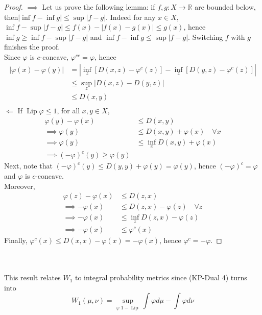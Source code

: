 \documentclass{article}
\theoremstyle{definition}
\theoremstyle{remark}
\DeclareMathOperator{\lip}{Lip}
\begin{document}
\begin{proof}
$\implies$ Let us prove the following lemma: if $f,g:X \to \mathbb R$ are bounded below, then\newline $|\inf f -\inf g|\leq \sup |f-g|$. Indeed for any $x\in X$, $\inf f - \sup |f-g| \leq f(x) - |f(x)-g(x)|\leq g(x)$, hence $\inf g \geq \inf f - \sup |f-g|$ and $\inf f - \inf g \leq \sup|f-g|$. Switching $f$ with $g$ finishes the proof.\\
Since $\varphi$ is $c$-concave, $\varphi^{cc}=\varphi$, hence $$\begin{aligned}|\varphi(x)-\varphi(y)| &= |\inf_z [D(x,z)-\varphi^{c}(z)]-\inf_z [D(y,z)-\varphi^{c}(z)]|\\
&\leq \sup_z |D(x,z) - D(y,z)|\\ &\leq D(x,y)\\
\end{aligned}$$	
$\Longleftarrow$ If $\lip \varphi \leq 1$, for all $x,y\in X$, 
$$\begin{aligned}
\varphi(y)-\varphi(x)&\leq D(x,y)\\
\implies \varphi(y) &\leq D(x,y) + \varphi(x) \quad \forall x \\
\implies \varphi(y) &\leq \inf_x D(x,y)+\varphi(x)\\
\implies (-\varphi)^c(y) \geq \varphi(y)
\end{aligned}$$
Next, note that $(-\varphi)^c(y)\leq D(y,y) + \varphi(y) = \varphi(y)$, hence $(-\varphi)^c = \varphi$ and $\varphi$ is $c$-concave.\\
Moreover, 
$$\begin{aligned}
\varphi(z)-\varphi(x)&\leq D(z,x)\\
\implies -\varphi(x) &\leq D(z,x) - \varphi(z) \quad \forall z \\
\implies -\varphi(x) &\leq \inf_z D(z,x) - \varphi(z)\\
\implies -\varphi(x) &\leq \varphi^c(x)
\end{aligned}$$
Finally, $\varphi^c(x)\leq D(x,x) - \varphi(x) = -\varphi(x)$, hence $\varphi^c = -\varphi$.
\end{proof}
\hfill \\\\
This result relates $W_1$ to integral probability metrics since (KP-Dual 4) turns into $$W_1(\mu,\nu) = \sup_{\varphi \; 1-\lip} \int \varphi d\mu - \int \varphi d\nu$$ 


 \newpage


\end{document}
